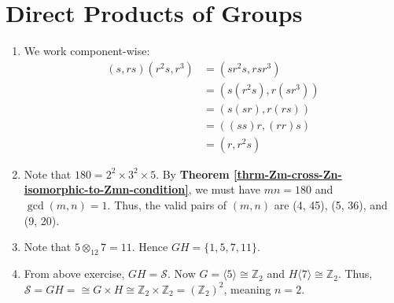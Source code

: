 \section{Direct Products of Groups}
\begin{enumerate}
    \item We work component-wise:
    \begin{align*}
        (s, rs)(r^2s, r^3) &= (sr^2s, rsr^3)\\
        &= (s(r^2s), r(sr^3))\\
        &= (s(sr), r(rs))\\
        &= ((ss)r, (rr)s)\\
        &= (r, r^2s)
    \end{align*}

    \item Note that $180 = 2^2 \times 3^2 \times 5$. By \textbf{Theorem \ref{thrm-Zm-cross-Zn-isomorphic-to-Zmn-condition}}, we must have $mn = 180$ and $\gcd(m, n) = 1$. Thus, the valid pairs of $(m,n)$ are (4, 45), (5, 36), and (9, 20).

    \item Note that $5 \otimes_{12} 7 = 11$. Hence $GH = \{1, 5, 7, 11\}$.

    \item From above exercise, $GH = \mathcal{S}$. Now $G = \langle 5 \rangle \cong \mathbb{Z}_2$ and $H \langle 7 \rangle \cong \mathbb{Z}_2$. Thus, $\mathcal{S} = GH = \cong G \times H \cong \mathbb{Z}_2 \times \mathbb{Z}_2 = (\mathbb{Z}_2)^2$, meaning $n = 2$.
\end{enumerate}

